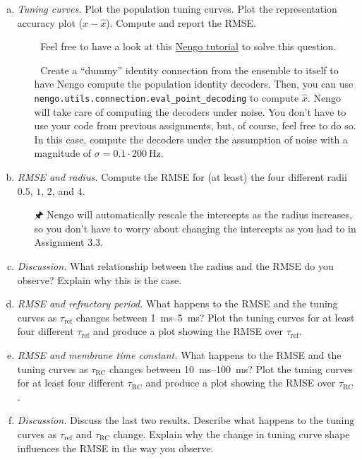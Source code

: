 	\begin{enumerate}[a)]
		\item {} \emph{Tuning curves.} Plot the population tuning curves. Plot the representation accuracy plot ($x - \hat{x}$). Compute and report the RMSE.
		\begin{itemize}
			\item[{\symbolfont 🐍}]  Feel free to have a look at this \href{https://www.nengo.ai/nengo/examples/usage/tuning-curves.html}{Nengo tutorial} to solve this question.
			\item[{\symbolfont 🐍}] Create a \enquote{dummy} identity connection from the ensemble to itself to have Nengo compute the population identity decoders. Then, you can use \texttt{nengo.utils.connection.eval\_point\_decoding} to compute $\hat{x}$. Nengo will take care of computing the decoders under noise. You don't have to use your code from previous assignments, but, of course, feel free to do so. In this case, compute the decoders under the assumption of noise with a magnitude of $\sigma = 0.1 \cdot \SI{200}{\hertz}$.
		\end{itemize}
		\item {} \emph{RMSE and radius.} Compute the RMSE for (at least) the four different radii $0.5$, $1$, $2$, and $4$.
		\begin{itemize}
			\item[{\symbolfont 🖈}]  Nengo will automatically rescale the intercepts as the radius increases, so you don't have to worry about changing the intercepts as you had to in Assignment 3.3.
		\end{itemize}
		\item {} \emph{Discussion.} What relationship between the radius and the RMSE do you observe? Explain why this is the case.
		\item {} \emph{RMSE and refractory period.} What happens to the RMSE and the tuning curves as $\tau_\mathrm{ref}$ changes between \SIrange{1}{5}{\milli\second}? Plot the tuning curves for at least four different $\tau_\mathrm{ref}$ and produce a plot showing the RMSE over $\tau_\mathrm{ref}$.
		\item {} \emph{RMSE and membrane time constant.} What happens to the RMSE and the tuning curves as $\tau_\mathrm{RC}$ changes between \SIrange{10}{100}{\milli\second}? Plot the tuning curves for at least four different $\tau_\mathrm{RC}$ and produce a plot showing the RMSE over $\tau_\mathrm{RC}$.
		\item {} \emph{Discussion.} Discuss the last two results. Describe what happens to the tuning curves as $\tau_\mathrm{ref}$ and $\tau_\mathrm{RC}$ change. Explain why the change in tuning curve shape influences the RMSE in the way you observe.
	\end{enumerate}


